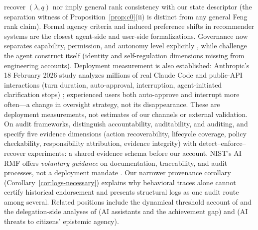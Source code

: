 recover $(\lambda,q)$ nor imply general rank consistency with our state
descriptor (the separation witness of Proposition~\ref{prop:c0}(ii) is distinct
from any general Feng rank claim). Formal agency criteria \citep{kenton2023} and
induced preference shifts in recommender systems \citep{carroll2022} are the
closest agent-side and user-side formalizations. Governance now separates
capability, permission, and autonomy level explicitly
\citep{capability_permission2026}, while \citet{xing2026} challenge the agent
construct itself (identity and self-regulation dimensions missing from
engineering accounts). Deployment measurement is also established: Anthropic's
18 February 2026 study analyzes millions of real Claude Code and public-API
interactions (turn duration, auto-approval, interruption, agent-initiated
clarification stops) \citep{anthropic2026agents}; experienced users both
auto-approve and interrupt more often---a change in oversight strategy, not its
disappearance. These are deployment measurements, not estimates of our channels
or external validation. On audit frameworks, \citet{nian2026auditable}
distinguish accountability, auditability, and auditing, and specify five
evidence dimensions (action recoverability, lifecycle coverage, policy
checkability, responsibility attribution, evidence integrity) with
detect--enforce--recover experiments: a shared evidence schema before our
account. NIST's AI RMF offers \emph{voluntary guidance} on documentation,
traceability, and audit processes, not a deployment mandate \citep{nist2023}.
Our narrower provenance corollary (Corollary~\ref{cor:logs-necessary}) explains
why behavioral traces alone cannot certify historical endorsement and presents
structural logs as one audit route among several. Related positions include the
dynamical threshold account of \citet{vanlier2024} and the delegation-side
analyses of \citet{danaher2018} (AI assistants and the achievement gap) and
\citet{coeckelbergh2023} (AI threats to citizens' epistemic agency).

